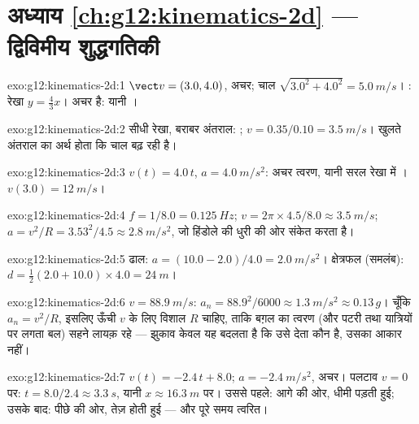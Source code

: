\section*{अध्याय \ref{ch:g12:kinematics-2d} --- द्विविमीय शुद्धगतिकी}

\begin{solution}{exo:g12:kinematics-2d:1}
$\vect v = (3.0, 4.0)$, अचर; चाल $\sqrt{3.0^2 + 4.0^2} =
\qty{5.0}{m/s}$। : रेखा $y = \tfrac43 x$।  अचर
है: यानी ।
\end{solution}

\begin{solution}{exo:g12:kinematics-2d:2}
सीधी रेखा, बराबर अंतराल: ; $v = 0.35/0.10 = \qty{3.5}{m/s}$। खुलते अंतराल का
अर्थ होता कि चाल बढ़ रही है।
\end{solution}

\begin{solution}{exo:g12:kinematics-2d:3}
$v(t) = 4.0\,t$, $a = \qty{4.0}{m/s^2}$: अचर त्वरण, यानी सरल रेखा में । $v(3.0) = \qty{12}{m/s}$।
\end{solution}

\begin{solution}{exo:g12:kinematics-2d:4}
$f = 1/8.0 = \qty{0.125}{Hz}$; $v = 2\pi \times 4.5/8.0 \approx \qty{3.5}{m/s}$; $a = v^2/R = 3.53^2/4.5 \approx \qty{2.8}{m/s^2}$, जो हिंडोले की धुरी की ओर संकेत करता है।
\end{solution}

\begin{solution}{exo:g12:kinematics-2d:5}
ढाल: $a = (10.0 - 2.0)/4.0 = \qty{2.0}{m/s^2}$। क्षेत्रफल (समलंब): $d = \tfrac12 (2.0 + 10.0) \times 4.0 = \qty{24}{m}$।
\end{solution}

\begin{solution}{exo:g12:kinematics-2d:6}
$v = \qty{88.9}{m/s}$: $a_n = 88.9^2/6000 \approx \qty{1.3}{m/s^2}
\approx 0.13\,g$। चूँकि $a_n = v^2/R$, इसलिए ऊँची $v$ के लिए विशाल $R$ चाहिए,
ताकि बग़ल का त्वरण (और पटरी तथा यात्रियों पर लगता बल) सहने लायक़ रहे
--- झुकाव केवल यह बदलता है कि उसे देता कौन है, उसका आकार नहीं।
\end{solution}

\begin{solution}{exo:g12:kinematics-2d:7}
$v(t) = -2.4\,t + 8.0$; $a = \qty{-2.4}{m/s^2}$, अचर। पलटाव $v = 0$ पर: $t = 8.0/2.4 \approx \qty{3.3}{s}$, यानी $x \approx \qty{16.3}{m}$ पर। उससे पहले: आगे
की ओर, धीमी पड़ती हुई; उसके बाद: पीछे की ओर, तेज़ होती हुई --- और पूरे समय
 त्वरित।
\end{solution}

